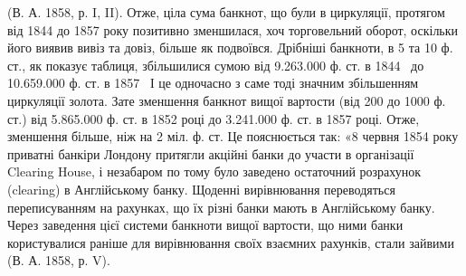 (В. А. 1858, р. I, II). Отже, ціла сума банкнот, що були в циркуляції, протягом
від 1844 до 1857 року позитивно зменшилася, хоч торговельний оборот,
оскільки його виявив вивіз та довіз, більше як подвоївся. Дрібніші банкноти,
в 5 та 10 ф. ст., як показує таблиця, збільшилися сумою від 9.263.000 ф. ст.
в 1844~ до 10.659.000 ф. ст. в 1857~ І це одночасно з саме тоді значним
збільшенням циркуляції золота. Зате зменшення банкнот вищої вартости (від
200 до 1000 ф. ст.) від 5.865.000 ф. ст. в 1852 році до 3.241.000 ф. ст. в
1857 році. Отже, зменшення більше, ніж на 2 міл. ф. ст. Це пояснюється
так: «8 червня 1854 року приватні банкіри Лондону притягли акційні банки
до участи в організації Clearing House, і незабаром по тому було заведено
остаточний розрахунок (clearing) в Англійському банку. Щоденні вирівнювання
переводяться переписуванням на рахунках, що їх різні банки мають в Англійському
банку. Через заведення цієї системи банкноти вищої вартости, що ними
банки користувалися раніше для вирівнювання своїх взаємних рахунків, стали
зайвими (В. А. 1858, р. V).
